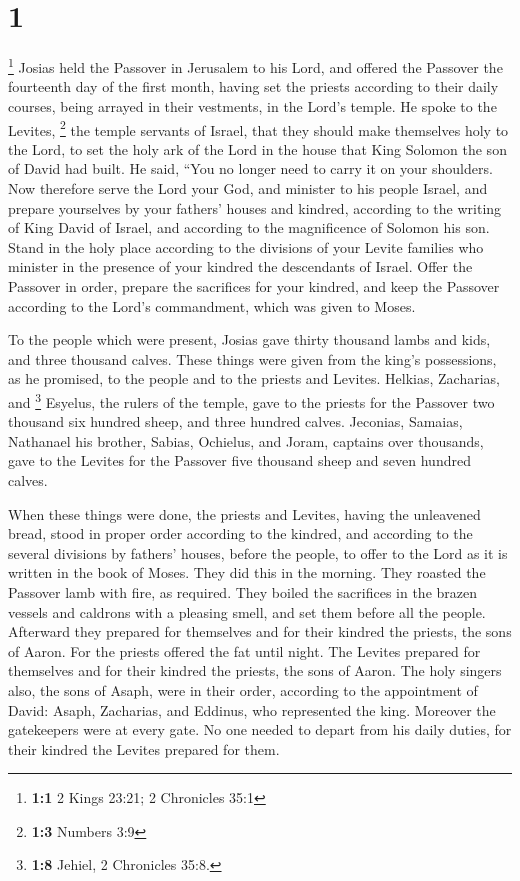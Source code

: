 \hypertarget{section}{%
\section{1}\label{section}}

 \footnote{\textbf{1:1} 2 Kings 23:21; 2 Chronicles 35:1}
Josias held the Passover in Jerusalem to his Lord, and offered the
Passover the fourteenth day of the first month,  having
set the priests according to their daily courses, being arrayed in their
vestments, in the Lord's temple.  He spoke to the Levites,
\footnote{\textbf{1:3} Numbers 3:9} the temple servants of Israel, that
they should make themselves holy to the Lord, to set the holy ark of the
Lord in the house that King Solomon the son of David had built.
 He said, ``You no longer need to carry it on your
shoulders. Now therefore serve the Lord your God, and minister to his
people Israel, and prepare yourselves by your fathers' houses and
kindred,  according to the writing of King David of
Israel, and according to the magnificence of Solomon his son. Stand in
the holy place according to the divisions of your Levite families who
minister in the presence of your kindred the descendants of Israel.
 Offer the Passover in order, prepare the sacrifices for
your kindred, and keep the Passover according to the Lord's commandment,
which was given to Moses.

 To the people which were present, Josias gave thirty
thousand lambs and kids, and three thousand calves. These things were
given from the king's possessions, as he promised, to the people and to
the priests and Levites.  Helkias, Zacharias, and
\footnote{\textbf{1:8} Jehiel, 2 Chronicles 35:8.} Esyelus, the rulers
of the temple, gave to the priests for the Passover two thousand six
hundred sheep, and three hundred calves.  Jeconias,
Samaias, Nathanael his brother, Sabias, Ochielus, and Joram, captains
over thousands, gave to the Levites for the Passover five thousand sheep
and seven hundred calves.

 When these things were done, the priests and Levites,
having the unleavened bread, stood in proper order according to the
kindred,  and according to the several divisions by
fathers' houses, before the people, to offer to the Lord as it is
written in the book of Moses. They did this in the morning.
 They roasted the Passover lamb with fire, as required.
They boiled the sacrifices in the brazen vessels and caldrons with a
pleasing smell,  and set them before all the people.
Afterward they prepared for themselves and for their kindred the
priests, the sons of Aaron.  For the priests offered the
fat until night. The Levites prepared for themselves and for their
kindred the priests, the sons of Aaron.  The holy singers
also, the sons of Asaph, were in their order, according to the
appointment of David: Asaph, Zacharias, and Eddinus, who represented the
king.  Moreover the gatekeepers were at every gate. No
one needed to depart from his daily duties, for their kindred the
Levites prepared for them.

